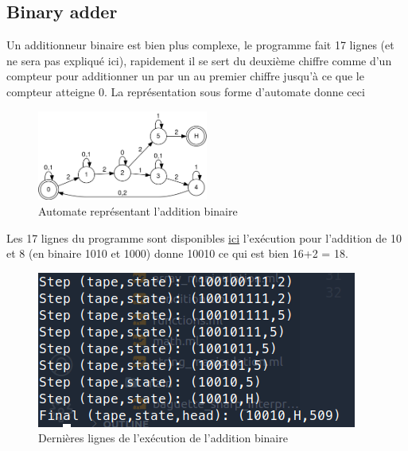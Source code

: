 \documentclass[11pt,colorlinks=true,a4paper]{article}
\begin{document}
    \subsection{Binary adder}
    Un additionneur binaire est bien plus complexe, le programme fait 17 lignes (et ne sera pas expliqué ici), rapidement 
    il se sert du deuxième chiffre comme d'un compteur pour additionner un par un au premier chiffre jusqu'à ce que le compteur atteigne 0.
    La représentation sous forme d'automate donne ceci
    \begin{figure}[H]
        \center 
        \includegraphics[width=0.5\textwidth]{img/automata2.png}
        \caption{Automate représentant l'addition binaire}
    \end{figure}
    Les 17 lignes du programme sont disponibles \href{https://github.com/coco33920/ocaml-baguettesharp-interpreter/blob/master/examples/turing_programs.txt#L5}{ici}
    l'exécution pour l'addition de 10 et 8 (en binaire 1010 et 1000) donne 10010 ce qui est bien 16+2 = 18.
    \begin{figure}[H]
        \center 
        \includegraphics[]{img/adder.png}
        \caption{Dernières lignes de l'exécution de l'addition binaire}
    \end{figure}
\end{document}
